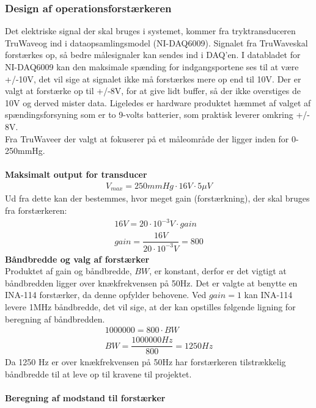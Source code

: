 \subsubsection{Design af operationsforstærkeren}
Det elektriske signal der skal bruges i systemet, kommer fra tryktransduceren TruWave\texttrademark og ind i dataopsamlingsmodel (NI-DAQ6009). Signalet fra TruWave\texttrademark skal forstærkes op, så bedre målesignaler kan sendes ind i DAQ’en. I databladet for NI-DAQ6009 kan den maksimale spænding for indgangsportene ses til at være +/-10V, det vil sige at signalet ikke må forstærkes mere op end til 10V. Der er valgt at forstærke op til +/-8V, for at give lidt buffer, så der ikke overstiges de 10V og derved mister data. Ligeledes er hardware produktet hæmmet af valget af spændingsforsyning som er to 9-volts batterier, som praktisk leverer omkring +/- 8V.\\ 
Fra TruWave\texttrademark er der valgt at fokuserer på et måleområde der ligger inden for 0-250mmHg. \\\\
\textbf{Maksimalt output for transducer}\\
\begin{align}
V_{max}=250mmHg\cdot 16V\cdot 5\mu V 
\end{align}
Ud fra dette kan der bestemmes, hvor meget gain (forstærkning), der skal bruges fra forstærkeren:
\begin{align}
16V = 20\cdot 10^{-3}V\cdot gain\\
gain = \dfrac{16V}{20\cdot 10^{-3}V}=800
\end{align}
\textbf{Båndbredde og valg af forstærker}\\
Produktet af gain og båndbredde, $BW$, er konstant, derfor er det vigtigt at båndbredden ligger over knækfrekvensen på 50Hz. Det er valgte at benytte en INA-114 forstærker, da denne opfylder behovene. Ved $gain=1$ kan INA-114 levere 1MHz båndbredde, det vil sige, at der kan opstilles følgende ligning for beregning af båndbredden.
\begin{align}
1000000 = 800\cdot BW\\
BW = \dfrac{1000000Hz}{800}=1250Hz
\end{align}
Da 1250 Hz er over knækfrekvensen på 50Hz har forstærkeren tilstrækkelig båndbredde til at leve op til kravene til projektet.\\\\
\textbf{Beregning af modstand til forstærker}\\

